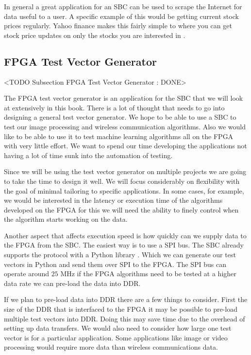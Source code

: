 In general a great application for an \ac{SBC} can be used to scrape the Internet for data useful to a user. A specific example of this would be getting current stock prices regularly. Yahoo finance makes this fairly simple to where you can get stock price updates on only the stocks you are interested in \cite{stocktick}. 
	
	
\subsection{FPGA Test Vector Generator}
	<TODO Subsection FPGA Test Vector Generator : DONE>

The \ac{FPGA} test vector generator is an application for the \ac{SBC} that we will look at extensively in this book. There is a lot of thought that needs to go into designing a general test vector generator. We hope to be able to use a \ac{SBC} to test our image processing and wireless communication algorithms. Also we would like to be able to use it to test machine learning algorithms all on the \ac{FPGA} with very little effort. We want to spend our time developing the applications not having a lot of time sunk into the automation of testing.

Since we will be using the test vector generator on multiple projects we are going to take the time to design it well. We will focus considerably on flexibility with the goal of minimal tailoring to specific applications. In some cases, for example, we would be interested in the latency or execution time of the algorithms developed on the \ac{FPGA} for this we will need the ability to finely control when the algorithm starts working on the data. 

Another aspect that affects execution speed is how quickly can we supply data to the \ac{FPGA} from the \ac{SBC}. The easiest way is to use a \ac{SPI} bus. The \ac{SBC} already supports the protocol with a Python library \cite{pispidev}. Which we can generate our test vectors in Python and send them over \ac{SPI} to the \ac{FPGA}. The \ac{SPI} bus can operate around $25$ \ac{MHz} if the \ac{FPGA} algorithms need to be tested at a higher data rate we can pre-load the data into \ac{DDR}. 

If we plan to pre-load data into \ac{DDR} there are a few things to consider. First the size of the \ac{DDR} that is interfaced to the \ac{FPGA} it may be possible to pre-load multiple test vectors into \ac{DDR}. Doing this may save time due to the overhead of setting up data transfers. We would also need to consider how large one test vector is for a particular application. Some applications like image or video processing would require more data than wireless communications data.

